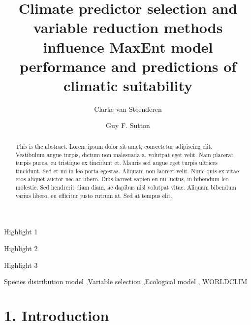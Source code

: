 \documentclass[
  authoryear,
  preprint,
  3p,
  onecolumn]{elsarticle}
\begin{document}
\begin{frontmatter}
\title{Climate predictor selection and variable reduction methods
influence MaxEnt model performance and predictions of climatic
suitability}
\author[1]{Clarke van Steenderen%
%
}
\author[1]{Guy F. Sutton%
%
}




        
\begin{abstract}
This is the abstract. Lorem ipsum dolor sit amet, consectetur adipiscing
elit. Vestibulum augue turpis, dictum non malesuada a, volutpat eget
velit. Nam placerat turpis purus, eu tristique ex tincidunt et. Mauris
sed augue eget turpis ultrices tincidunt. Sed et mi in leo porta
egestas. Aliquam non laoreet velit. Nunc quis ex vitae eros aliquet
auctor nec ac libero. Duis laoreet sapien eu mi luctus, in bibendum leo
molestie. Sed hendrerit diam diam, ac dapibus nisl volutpat vitae.
Aliquam bibendum varius libero, eu efficitur justo rutrum at. Sed at
tempus elit.
\end{abstract}



\begin{highlights}
\item Highlight 1\item Highlight 2\item Highlight 3
\end{highlights}


\begin{keyword}
    Species distribution model \sep Variable selection \sep Ecological
model \sep 
    WORLDCLIM
\end{keyword}
\end{frontmatter}
    \ifdefined\Shaded\renewenvironment{Shaded}{\begin{tcolorbox}[frame hidden, borderline west={3pt}{0pt}{shadecolor}, breakable, sharp corners, boxrule=0pt, enhanced, interior hidden]}{\end{tcolorbox}}\fi

\hypertarget{introduction}{%
\section{1. Introduction}\label{introduction}}
\end{document}
